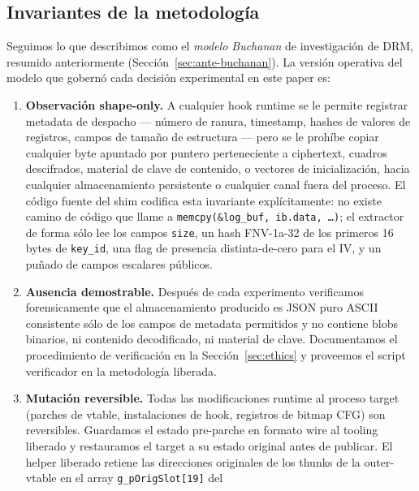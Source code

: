 \documentclass[11pt,letterpaper]{article}
\begin{document}
\subsection{Invariantes de la metodología}
\label{sec:threat-invariants}

Seguimos lo que describimos como el \emph{modelo Buchanan} de
investigación de DRM, resumido anteriormente
(Sección~\ref{sec:ante-buchanan}). La versión operativa del
modelo que gobernó cada decisión experimental en este paper es:

\begin{enumerate}[itemsep=2pt,topsep=2pt]
  \item \textbf{Observación shape-only.} A cualquier hook runtime
        se le permite registrar metadata de despacho --- número de
        ranura, timestamp, hashes de valores de registros, campos
        de tamaño de estructura --- pero se le prohíbe copiar
        cualquier byte apuntado por puntero perteneciente a
        ciphertext, cuadros descifrados, material de clave de
        contenido, o vectores de inicialización, hacia cualquier
        almacenamiento persistente o cualquier canal fuera del
        proceso. El código fuente del shim codifica esta
        invariante explícitamente: no existe camino de código
        que llame a \texttt{memcpy(\&log\_buf, ib.data, \dots)};
        el extractor de forma sólo lee los campos \texttt{size},
        un hash FNV-1a-32 de los primeros 16 bytes de
        \texttt{key\_id}, una flag de presencia distinta-de-cero
        para el IV, y un puñado de campos escalares públicos.
  \item \textbf{Ausencia demostrable.} Después de cada experimento
        verificamos forensicamente que el almacenamiento producido
        es JSON puro ASCII consistente sólo de los campos de
        metadata permitidos y no contiene blobs binarios, ni
        contenido decodificado, ni material de clave. Documentamos
        el procedimiento de verificación en la
        Sección~\ref{sec:ethics} y proveemos el script verificador
        en la metodología liberada.
  \item \textbf{Mutación reversible.} Todas las modificaciones
        runtime al proceso target (parches de vtable,
        instalaciones de hook, registros de bitmap CFG) son
        reversibles. Guardamos el estado pre-parche en formato
        wire al tooling liberado y restauramos el target a su
        estado original antes de publicar. El helper liberado
        retiene las direcciones originales de los thunks de la
        outer-vtable en el array \texttt{g\_pOrigSlot[19]} del

\end{enumerate}
\end{document}
